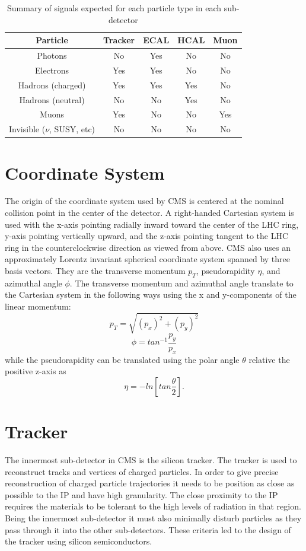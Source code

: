 \begin{table}[h]
	\centering
\begin{tabular}{|c|c|c|c|c|}
	\hline 
	Particle & Tracker & ECAL & HCAL & Muon \\ 
	\hline 
	Photons & No & Yes & No & No \\ 
	\hline 
	Electrons & Yes & Yes & No & No \\ 
	\hline 
	Hadrons (charged) & Yes & Yes & Yes & No \\ 
	\hline 
	Hadrons (neutral) & No & No & Yes & No \\ 
	\hline 
	Muons & Yes & No & No & Yes \\ 
	\hline 
	Invisible ($\nu$, SUSY, etc) & No & No & No & No \\ 
	\hline 
\end{tabular} 
\caption{Summary of signals expected for each particle type in each sub-detector}
\label{table:subdetsignals}
\end{table}


\section{Coordinate System}
The origin of the coordinate system used by CMS is centered at the nominal collision point in the center of the detector.  A right-handed Cartesian system is used with the x-axis pointing radially inward toward the center of the LHC ring, y-axis pointing vertically upward, and the z-axis pointing tangent to the LHC ring in the counterclockwise direction as viewed from above.  CMS also uses an approximately Lorentz invariant spherical coordinate system spanned by three basis vectors.  They are the transverse momentum $p_{T}$, pseudorapidity $\eta$, and azimuthal angle $\phi$.  The transverse momentum and azimuthal angle translate to the Cartesian system in the following ways using the x and y-components of the linear momentum:
\begin{equation}
p_{T} = \sqrt{(p_{x})^{2} + (p_{y})^{2}}
\end{equation}
\begin{equation}
\phi = tan^{-1}\frac{p_{y}}{p_{x}}
\end{equation}
while the pseudorapidity can be translated using the polar angle $\theta$ relative the positive z-axis as
\begin{equation}
\eta = -ln[tan\frac{\theta}{2}].
\end{equation}


\section{Tracker}
The innermost sub-detector in CMS is the silicon tracker.  The tracker is used to reconstruct tracks and vertices of charged particles.  In order to give precise reconstruction of charged particle trajectories it needs to be position as close as possible to the IP and have high granularity.  The close proximity to the IP requires the materials to be tolerant to the high levels of radiation in that region.  Being the innermost sub-detector it must also minimally disturb particles as they pass through it into the other sub-detectors.  These criteria led to the design of the tracker using silicon semiconductors.

